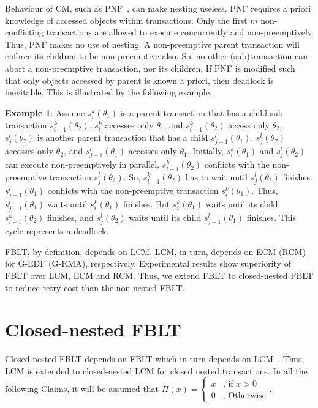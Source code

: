 \documentclass[letter]{sig-alternate}
\begin{document}
Behaviour of CM, such as PNF~\cite{pnf_dac_asp}, can make nesting useless. PNF requires a priori knowledge of accessed objects within transactions. Only the first $m$ non-conflicting transactions are allowed to execute concurrently and non-preemptively. Thus, PNF makes no use of nesting. A non-preemptive parent transaction will enforce its children to be non-preemptive also. So, no other (sub)transaction can abort a non-preemptive transaction, nor its children. If PNF is modified such that only objects accessed by parent is known a priori, then deadlock is inevitable. This is illustrated by the following example.

\textbf{Example 1}\label{Example-1:pnf_nesting_deadlock}: Assume $s_{i}^{k}(\theta_{1})$ is a parent transaction that has a child sub-transaction $s_{i-1}^{k}(\theta_{2})$. $s_{i}^{k}$ accesses only $\theta_{1}$, and $s_{i-1}^{k}(\theta_{2})$ access only $\theta_{2}$. $s_{j}^{l}(\theta_{2})$ is another parent transaction that has a child $s_{j-1}^{l} (\theta_{1})$. $s_{j}^{l}(\theta_{2})$ accesses only $\theta_{2}$, and $s_{j-1}^{l}(\theta_{1})$ accesses only $\theta_{1}$. Initially, $s_{i}^{k}(\theta_{1})$ and $s_{j}^{l}(\theta_{2})$ can execute non-preemptively in parallel. $s_{i-1}^{k}(\theta_{2})$ conflicts with the non-preemptive transaction $s_{j}^{l}(\theta_{2})$. So, $s_{i-1}^{k}(\theta_{2})$ has to wait until $s_{j}^{l}(\theta_{2})$ finishes. $s_{j-1}^{l}(\theta_{1})$ conflicts with the non-preemptive transaction $s_{i}^{k}(\theta_{1})$. Thus, $s_{j-1}^{l}(\theta_{1})$ waits until $s_{i}^{k}(\theta_{1})$ finishes. But $s_{i}^{k}(\theta_{1})$ waits until its child $s_{i-1}^{k}(\theta_{2})$ finishes, and $s_{j}^{l}(\theta_{2})$ waits until its child $s_{j-1}^{l}(\theta_{1})$ finishes. This cycle represents a deadlock.

FBLT\cite{fblt}, by definition, depends on LCM. LCM, in turn, depends
on ECM (RCM) for G-EDF (G-RMA), respectively. Experimental results
show superiority of FBLT over LCM, ECM and RCM\cite{fblt}. Thus, we extend FBLT to closed-nested FBLT to reduce retry cost than the non-nested FBLT.

\section{Closed-nested FBLT}\label{sec:closed_nested_fblt_design}

Closed-nested FBLT depends on FBLT which in turn depends on LCM~\cite{lcmdac2012}. Thus, LCM is extended to closed-nested LCM for closed nested transactions. In all the following Claims, it will be assumed that 
$\Pi(x)=\begin{cases}
x & \mbox{, if }x>0\\
0 & \mbox{, Otherwise}
\end{cases}$.
\end{document}
